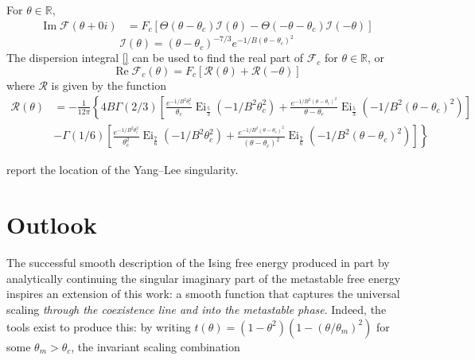 \documentclass[
  aps,
  pre,
  preprint,
  longbibliography,
  floatfix
]{revtex4-2}
\begin{document}
For $\theta\in\mathbb R$,
\begin{equation}
  \begin{aligned}
    \operatorname{Im}\mathcal F(\theta+0i)&=F_c[\Theta(\theta-\theta_c)\mathcal I(\theta)-\Theta(-\theta-\theta_c)\mathcal I(-\theta)]
  \end{aligned}
\end{equation}
\begin{equation}
  \mathcal I(\theta)=(\theta-\theta_c)^{-7/3}e^{-1/B(\theta-\theta_c)^2}
\end{equation}
The dispersion integral \eqref{} can be used to find the real part of $\mathcal F_c$ for $\theta\in\mathbb R$, or
\begin{equation} \label{eq:2d.real.Fc}
  \operatorname{Re}\mathcal F_c(\theta)=F_c[\mathcal R(\theta)+\mathcal R(-\theta)]
\end{equation}
where $\mathcal R$ is given by the function
\begin{equation}
  \begin{aligned}
  \mathcal R(\theta)
  &=
  -\frac1{12\pi}\left\{
    4B\Gamma(2/3)\left[\frac{e^{-1/B^2\theta_c^2}}{\theta_c}\operatorname{Ei}_{\frac53}(-1/B^2\theta_c^2)
  +\frac{e^{-1/B^2(\theta-\theta_c)^2}}{\theta-\theta_c}\operatorname{Ei}_{\frac53}(-1/B^2(\theta-\theta_c)^2)\right]\right. \\
  &\left.-\Gamma(1/6)\left[\frac{e^{-1/B^2\theta_c^2}}{\theta_c^2}\operatorname{Ei}_{\frac76}(-1/B^2\theta_c^2) 
      +\frac{e^{-1/B^2(\theta-\theta_c)^2}}{(\theta-\theta_c)^2}\operatorname{Ei}_{\frac76}(-1/B^2(\theta-\theta_c)^2)
  \right]
  \right\}
  \end{aligned}
\end{equation}

\cite{Connelly_2020_Universal} report the location of the Yang--Lee singularity.

\section{Outlook}

The successful smooth description of the Ising free energy produced in part by analytically continuing the singular imaginary part of the metastable free energy inspires an extension of this work: a smooth function that captures the universal scaling \emph{through the coexistence line and into the metastable phase}. Indeed, the tools exist to produce this: by writing $t(\theta)=(1-\theta^2)(1-(\theta/\theta_m)^2)$ for some $\theta_m>\theta_c$, the invariant scaling combination
\end{document}
